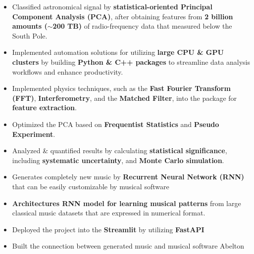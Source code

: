 \documentclass[10pt,a4paper,ragged2e,withhyper]{altacv}
\begin{document}
\begin{paracol}{2}

\begin{itemize}
\item Classified astronomical signal by {\bf statistical-oriented Principal Component Analysis (PCA)}, after obtaining features from {\bf 2 billion amounts (${\sim}$200 TB)} of radio-frequency data that measured below the South Pole.
\item Implemented automation solutions for utilizing {\bf large CPU \& GPU clusters} by building {\bf Python \& C++ packages} to streamline data analysis workflows and enhance productivity.
\item Implemented physics techniques, such as the {\bf Fast Fourier Transform (FFT)}, {\bf Interferometry}, and the {\bf Matched Filter}, into the package for {\bf feature extraction}.
\item Optimized the PCA based on {\bf Frequentist Statistics} and {\bf Pseudo Experiment}.
\item Analyzed \& quantified results by calculating {\bf statistical significance}, including {\bf systematic uncertainty}, and {\bf Monte Carlo simulation}.

\end{itemize}

\divider

\begin{itemize}
\item Generates completely new music by {\bf Recurrent Neural Network (RNN)} that can be easily customizable by musical software
\item {\bf Architectures RNN model for learning musical patterns} from large classical music datasets that are expressed in numerical format. 
\item Deployed the project into the {\bf Streamlit} by utilizing {\bf FastAPI}
\item Built the connection between generated music and musical software Abelton
\end{itemize}


\end{paracol}
\end{document}
